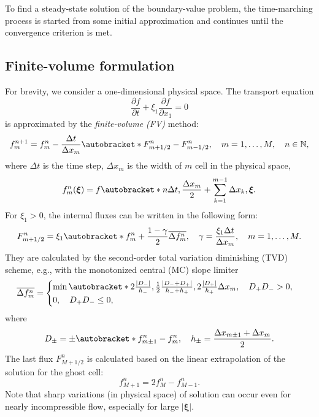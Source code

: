 \documentclass[]{elsarticle} %
\newcommand{\pder}[2][]{\frac{\partial#1}{\partial#2}}
\DeclarePairedDelimiter\autobracket()       %
\newcommand{\br}[1]{\autobracket*{#1}}
\newcommand{\bxi}{{\boldsymbol{\xi}}}
\begin{document}
{%
To find a steady-state solution of the boundary-value problem,
the time-marching process is started from some initial approximation
and continues until the convergence criterion is met.

\subsection{Finite-volume formulation}\label{sec:fv}

For brevity, we consider a one-dimensional physical space.
The transport equation
\begin{equation}\label{eq:transport}
    \pder[f]{t} + \xi_1\pder[f]{x_1} = 0
\end{equation}
is approximated by the \emph{finite-volume (FV)} method:
\begin{equation}\label{eq:finite_volume}
    f^{n+1}_m = f^n_m - \frac{\Delta{t}}{\Delta{x_m}}\br{F^n_{m+1/2}-F^n_{m-1/2}}, \quad
    m = 1,\dots,M, \quad n\in\mathbb{N},
\end{equation}
where \(\Delta{t}\) is the time step, \(\Delta{x_m}\) is the width of \(m\) cell in the physical space,
\begin{equation}\label{eq:vdf_fv}
    f^n_m(\bxi) = f\br{n\Delta{t}, \frac{\Delta{x_m}}2 + \sum_{k=1}^{m-1}\Delta{x_k}, \bxi}.
\end{equation}
For \(\xi_1>0\), the internal fluxes can be written in the following form:
\begin{equation}\label{eq:internal_fluxes}
    F_{m+1/2}^n = \xi_1\br{ f_m^n + \frac{1-\gamma}2\overline{\Delta{f_m^n}}},
    \quad \gamma = \frac{\xi_1\Delta{t}}{\Delta{x_m}}, \quad m = 1,\dots,M.
\end{equation}
They are calculated by the second-order total variation diminishing (TVD) scheme,
e.g., with the monotonized central (MC) slope limiter
\begin{equation}\label{eq:limiter}
    \overline{\Delta{f_m^n}} = \begin{cases}\min\br{
         2\frac{|D_-|}{h_-}, \frac12\frac{|D_-+D_+|}{h_-+h_+}, 2\frac{|D_+|}{h_+}
    }\Delta{x_m}, \quad D_+D_- > 0, \\
    0, \quad D_+D_- \leq 0,
    \end{cases}
\end{equation}
where
\begin{equation}\label{eq:differences}
    D_\pm = \pm\br{f_{m\pm1}^n - f_m^n}, \quad h_\pm = \frac{\Delta{x_{m\pm1}} + \Delta{x_m}}2.
\end{equation}
The last flux \(F_{M+1/2}^n\) is calculated based on the linear extrapolation of the solution for the ghost cell:
\begin{equation}\label{eq:last_ghost}
    f_{M+1}^n = 2f_M^n - f_{M-1}^n.
\end{equation}
Note that sharp variations (in physical space) of solution can occur even for nearly incompressible flow,
especially for large \(|\bxi|\).

}
\end{document}
